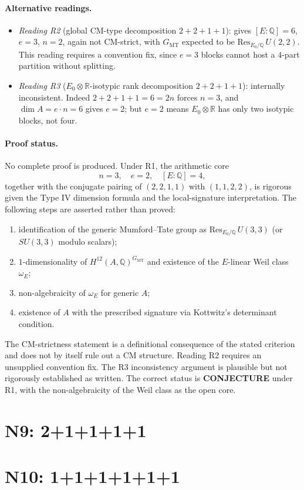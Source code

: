 \documentclass{article}
\begin{document}
\paragraph{Alternative readings.}
\begin{itemize}
\item \emph{Reading R2} (global CM-type decomposition \(2+2+1+1\)): gives \([E:\mathbb{Q}]=6\), \(e=3\), \(n=2\), again not CM-strict, with \(G_{\mathrm{MT}}\) expected to be \(\mathrm{Res}_{E_{0}/\mathbb{Q}}\,U(2,2)\). This reading requires a convention fix, since \(e=3\) blocks cannot host a \(4\)-part partition without splitting.
\item \emph{Reading R3} (\(E_{0}\otimes\mathbb{R}\)-isotypic rank decomposition \(2+2+1+1\)): internally inconsistent. Indeed \(2+2+1+1=6=2n\) forces \(n=3\), and \(\dim A = e\cdot n = 6\) gives \(e=2\); but \(e=2\) means \(E_{0}\otimes\mathbb{R}\) has only two isotypic blocks, not four.
\end{itemize}

\paragraph{Proof status.}
No complete proof is produced. Under R1, the arithmetic core
\[
n=3,\quad e=2,\quad [E:\mathbb{Q}]=4,
\]
together with the conjugate pairing of \((2,2,1,1)\) with \((1,1,2,2)\), is rigorous given the Type IV dimension formula and the local-signature interpretation. The following steps are asserted rather than proved:
\begin{enumerate}
\item identification of the generic Mumford--Tate group as \(\mathrm{Res}_{E_{0}/\mathbb{Q}}\,U(3,3)\) (or \(SU(3,3)\) modulo scalars);
\item \(1\)-dimensionality of \(H^{12}(A,\mathbb{Q})^{G_{\mathrm{MT}}}\) and existence of the \(E\)-linear Weil class \(\omega_{E}\);
\item non-algebraicity of \(\omega_{E}\) for generic \(A\);
\item existence of \(A\) with the prescribed signature via Kottwitz's determinant condition.
\end{enumerate}
The CM-strictness statement is a definitional consequence of the stated criterion and does not by itself rule out a CM structure. Reading R2 requires an unsupplied convention fix. The R3 inconsistency argument is plausible but not rigorously established as written. The correct status is \textbf{CONJECTURE} under R1, with the non-algebraicity of the Weil class as the open core.

\section{N9: 2+1+1+1+1}

\section{N10: 1+1+1+1+1+1}
\end{document}
